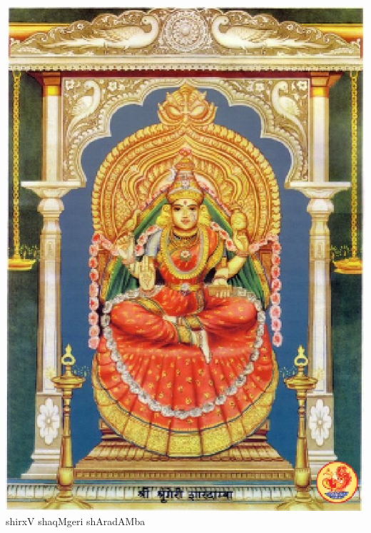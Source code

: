 \thispagestyle{empty}
\begin{center}
\vfill
\includegraphics[scale=0.7]{figures/figure2.eps}\\
shirxV shaqMgeri shAradAMba
\vfill
\end{center}
